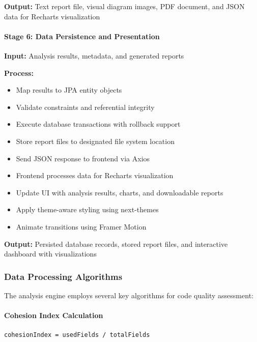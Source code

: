 \documentclass[12pt,a4paper]{article}
\begin{document}
    \textbf{Output:} Text report file, visual diagram images, PDF document, and JSON data for Recharts visualization

    \paragraph{Stage 6: Data Persistence and Presentation}

    \textbf{Input:} Analysis results, metadata, and generated reports

    \textbf{Process:}
    \begin{itemize}[leftmargin=0.5in]
        \item Map results to JPA entity objects
        \item Validate constraints and referential integrity
        \item Execute database transactions with rollback support
        \item Store report files to designated file system location
        \item Send JSON response to frontend via Axios
        \item Frontend processes data for Recharts visualization
        \item Update UI with analysis results, charts, and downloadable reports
        \item Apply theme-aware styling using next-themes
        \item Animate transitions using Framer Motion
    \end{itemize}

    \textbf{Output:} Persisted database records, stored report files, and interactive dashboard with visualizations

    \subsubsection{Data Processing Algorithms}

    The analysis engine employs several key algorithms for code quality assessment:

    \paragraph{Cohesion Index Calculation}

    \begin{Verbatim}[frame=single, fontsize=\small]
cohesionIndex = usedFields / totalFields
    \end{Verbatim}
\end{document}
